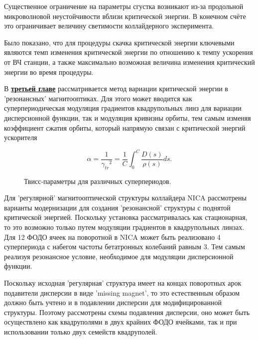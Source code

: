 \par Существенное ограничение на параметры сгустка возникают из-за продольной микроволновой неустойчивости вблизи критической энергии. В конечном счёте это ограничивает величину светимости коллайдерного эксперимента.

\par Было показано, что для процедуры скачка критической энергии ключевыми являются темп изменения критической энергии по отношению к темпу ускорения от ВЧ станции, а также максимально возможная величина изменения критический энергии во время процедуры.

В \underline{\textbf{третьей главе}} рассматривается метод вариации критической энергии в 'резонансных' магнитооптиках. Для этого может вводится как суперпериодическая модуляция градиентов квадрупольных линз для вариации дисперсионной функции, так и модуляция кривизны орбиты, тем самым изменяя коэффициент сжатия орбиты, который напрямую связан с критической энергий ускорителя 

\[
\alpha=\frac{1}{{\gamma_{tr}}^2}=\frac{1}{C}\int_{0}^{C}\frac{D\left(s\right)}{\rho\left(s\right)}ds.
\label{eq:alpha}
\]

\begin{figure}[ht]
    \caption{Твисс-параметры для различных суперпериодов.}\label{fig:latex}
\end{figure}

\par Для 'регулярной' магнитооптической структуры коллайдера NICA рассмотрены варианты модернизации для создания 'резонансной' структуры с поднятой критической энергией. Поскольку установка рассматривалась как стационарная, то это возможно только путем модуляции градиентов в квадрупольных линзах. Для 12 ФОДО ячеек на поворотной в NICA может быть реализовано 4 суперпериода с набегом частоты бетатронных колебаний равным 3. Тем самым реализуя резонансное условие, необходимое для модуляции дисперсионной функции.

\par Поскольку исходная 'регулярная' структура имеет на концах поворотных арок подавители дисперсии в виде 'missing magnet', то это естественным образом должно быть учтено и в подавлении дисперсии для модифицированной структуры. Поэтому рассмотрены схемы подавления дисперсии, оно может быть осуществлено как квадруполями в двух крайних ФОДО ячейками, так и при использовании только двух семейств квадруполей. 

